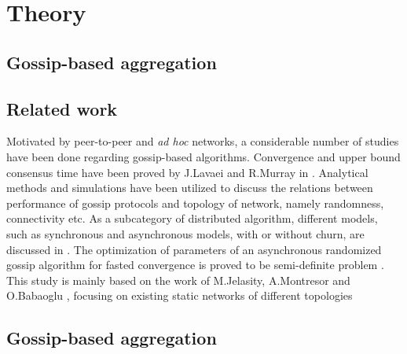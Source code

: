 \section{Theory}
\label{sec:theory}
\subsection{Gossip-based aggregation}
\subsection{Related work}
Motivated by peer-to-peer and {\it ad hoc} networks, a considerable number of studies have been done regarding gossip-based algorithms. Convergence and upper bound consensus time have been proved by J.Lavaei and R.Murray in \cite{5929538}. Analytical methods and simulations have been utilized to discuss the relations between performance of gossip protocols and topology of network, namely randomness, connectivity etc. As a subcategory of distributed algorithm, different models, such as synchronous and asynchronous models, with or without churn, are discussed in \cite{Lynch:1996:DA:525656}. The optimization of parameters of an asynchronous randomized gossip algorithm for fasted convergence is proved to be semi-definite problem \cite{Boyd2004}.\\
This study is mainly based on the work of M.Jelasity, A.Montresor and O.Babaoglu \cite{jelasity_gossip-based_2005}, focusing on existing static networks of different topologies \cite{knight_internet_2011}

\subsection{Gossip-based aggregation}

